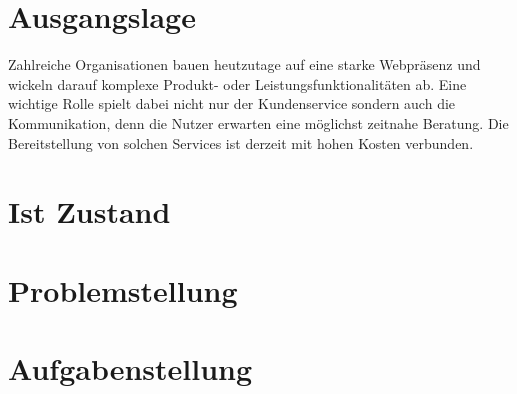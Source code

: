 \section{Ausgangslage}
Zahlreiche Organisationen bauen heutzutage auf eine starke Webpräsenz und wickeln darauf komplexe Produkt- oder Leistungsfunktionalitäten ab. Eine wichtige Rolle spielt dabei nicht nur der Kundenservice sondern auch die Kommunikation, denn die Nutzer erwarten eine möglichst zeitnahe Beratung. Die Bereitstellung von solchen Services ist derzeit mit hohen Kosten verbunden.

\section{Ist Zustand}
\lipsum[7-7]


\section{Problemstellung}
\lipsum[6-6]

\section{Aufgabenstellung}
\lipsum[3-3]
